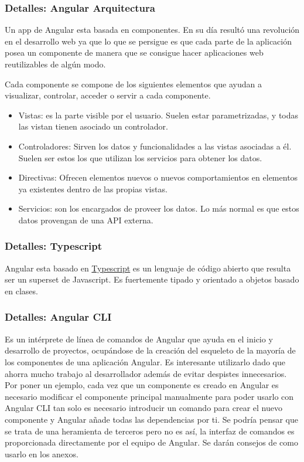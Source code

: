  

\subsubsection{Detalles: Angular Arquitectura}\label{detalle_angulararquitectura}
Un app de Angular esta basada en componentes. En su día resultó una revolución en el desarrollo web ya que lo que se persigue es que cada parte de la aplicación posea un componente de manera que se consigue hacer aplicaciones web reutilizables de algún modo.


Cada componente se compone de los siguientes elementos que ayudan a visualizar, controlar, acceder o servir a cada componente. 

\begin{itemize}
\tightlist
\item
Vistas: es la parte visible por el usuario. Suelen estar parametrizadas, y todas
las vistan tienen asociado un controlador.
\item
 Controladores: Sirven los datos y funcionalidades a las vistas asociadas a él. Suelen ser estos los que utilizan los servicios para obtener los datos.
\item
 Directivas: Ofrecen elementos nuevos o nuevos comportamientos en elementos ya existentes dentro de las propias vistas.
  \item
  Servicios: son los encargados de proveer los datos. Lo más normal es que estos datos provengan de una API externa.
\end{itemize}


\subsubsection{Detalles: Typescript}\label{detalle_typescript}
Angular esta basado en  \href{https://es.wikipedia.org/wiki/TypeScript}{Typescript}  es un lenguaje de código abierto que resulta ser un superset de Javascript. Es fuertemente tipado y orientado a objetos basado en clases.


\subsubsection{Detalles: Angular CLI}\label{detalle_angularcli}
Es un intérprete de línea de comandos de Angular que ayuda en el inicio y desarrollo de proyectos, ocupándose de la creación del esqueleto de la mayoría de los componentes de una aplicación Angular. Es interesante utilizarlo dado que ahorra mucho trabajo al desarrollador además de evitar despistes innecesarios. Por poner un ejemplo, cada vez que un componente es creado en Angular es necesario modificar el componente principal manualmente para poder usarlo con Angular CLI tan solo es necesario introducir un comando para crear el nuevo componente y Angular añade todas las dependencias por ti. Se podría pensar que se trata de una heramienta de terceros pero no es así, la interfaz de comandos es proporcionada directamente por el equipo de Angular. Se darán consejos de como usarlo en los anexos.

